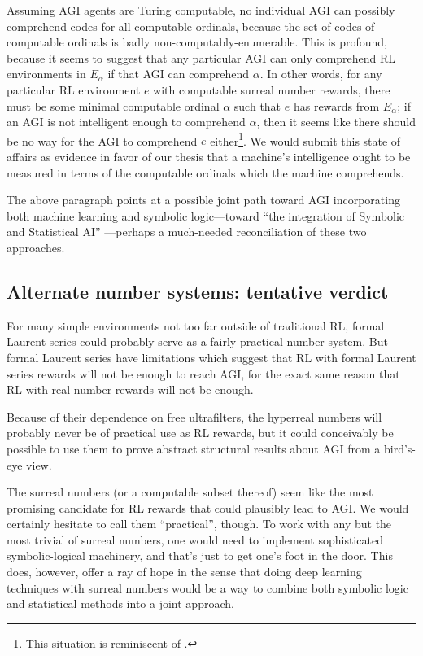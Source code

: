 \documentclass[twoside,11pt]{article}
\begin{document}
Assuming AGI agents are Turing computable,
no individual AGI can possibly comprehend codes for all computable ordinals, because
the set of codes of computable ordinals is badly non-computably-enumerable.
This is profound, because it seems to suggest that any particular AGI can
only comprehend RL environments in $E_\alpha$ if that AGI can comprehend $\alpha$.
In other words, for any particular RL environment $e$ with computable surreal number
rewards, there must be some minimal computable ordinal $\alpha$ such that $e$ has
rewards from $E_\alpha$; if an AGI is not intelligent enough to comprehend $\alpha$,
then it seems like there should be no way for the AGI to comprehend $e$
either\footnote{This situation is reminiscent of \citep{hibbard2011measuring}.}.
We would submit
this state of affairs as evidence in favor of our thesis
\citep{alexander2019measuring} that a machine's intelligence ought to be measured
in terms of the computable ordinals which the machine comprehends.

The above paragraph points at a possible joint path
toward AGI incorporating both machine learning and symbolic logic---toward
``the integration of Symbolic and Statistical AI'' \citep{maruyama}---perhaps
a much-needed reconciliation of these two approaches.

\subsection{Alternate number systems: tentative verdict}

For many simple environments not too far outside of traditional RL,
formal Laurent series could probably serve as a fairly practical number system.
But formal Laurent series have limitations which suggest that RL
with formal Laurent series rewards will not be enough to reach AGI, for the exact
same reason that RL with real number rewards will not be enough.

Because of their dependence on free ultrafilters, the hyperreal numbers will
probably never be of practical use as RL rewards, but it could conceivably be
possible to use them to prove abstract structural results about AGI from a
bird's-eye view.

The surreal numbers (or a computable subset thereof) seem like the most promising
candidate for RL rewards that could plausibly lead to AGI. We would certainly
hesitate to call them ``practical'', though. To work with any but the most trivial
of surreal numbers, one would need to implement sophisticated symbolic-logical
machinery, and that's just to get one's foot in the door. This does, however, offer
a ray of hope in the sense that doing deep learning techniques with surreal numbers
would be a way to combine both symbolic logic and statistical methods into a joint
approach.
\end{document}
